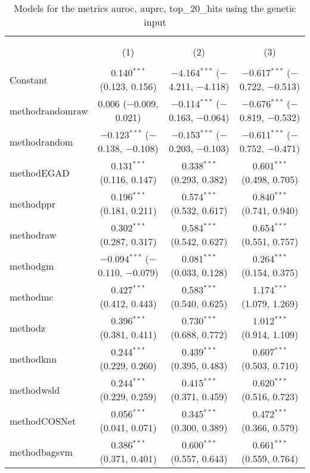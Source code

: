 
\begin{table}[!htbp] \centering 
  \caption{Models for the metrics auroc, auprc, top_20_hits using the genetic input} 
  \label{} 
\begin{tabular}{@{\extracolsep{5pt}}lccc} 
\\[-1.8ex]\hline 
\hline \\[-1.8ex] 
\\[-1.8ex] & (1) & (2) & (3)\\ 
\hline \\[-1.8ex] 
 Constant & 0.140$^{***}$ (0.123, 0.156) & $-$4.164$^{***}$ ($-$4.211, $-$4.118) & $-$0.617$^{***}$ ($-$0.722, $-$0.513) \\ 
  methodrandomraw & 0.006 ($-$0.009, 0.021) & $-$0.114$^{***}$ ($-$0.163, $-$0.064) & $-$0.676$^{***}$ ($-$0.819, $-$0.532) \\ 
  methodrandom & $-$0.123$^{***}$ ($-$0.138, $-$0.108) & $-$0.153$^{***}$ ($-$0.203, $-$0.103) & $-$0.611$^{***}$ ($-$0.752, $-$0.471) \\ 
  methodEGAD & 0.131$^{***}$ (0.116, 0.147) & 0.338$^{***}$ (0.293, 0.382) & 0.601$^{***}$ (0.498, 0.705) \\ 
  methodppr & 0.196$^{***}$ (0.181, 0.211) & 0.574$^{***}$ (0.532, 0.617) & 0.840$^{***}$ (0.741, 0.940) \\ 
  methodraw & 0.302$^{***}$ (0.287, 0.317) & 0.584$^{***}$ (0.542, 0.627) & 0.654$^{***}$ (0.551, 0.757) \\ 
  methodgm & $-$0.094$^{***}$ ($-$0.110, $-$0.079) & 0.081$^{***}$ (0.033, 0.128) & 0.264$^{***}$ (0.154, 0.375) \\ 
  methodmc & 0.427$^{***}$ (0.412, 0.443) & 0.583$^{***}$ (0.540, 0.625) & 1.174$^{***}$ (1.079, 1.269) \\ 
  methodz & 0.396$^{***}$ (0.381, 0.411) & 0.730$^{***}$ (0.688, 0.772) & 1.012$^{***}$ (0.914, 1.109) \\ 
  methodknn & 0.244$^{***}$ (0.229, 0.260) & 0.439$^{***}$ (0.395, 0.483) & 0.607$^{***}$ (0.503, 0.710) \\ 
  methodwsld & 0.244$^{***}$ (0.229, 0.259) & 0.415$^{***}$ (0.371, 0.459) & 0.620$^{***}$ (0.516, 0.723) \\ 
  methodCOSNet & 0.056$^{***}$ (0.041, 0.071) & 0.345$^{***}$ (0.300, 0.389) & 0.472$^{***}$ (0.366, 0.579) \\ 
  methodbagsvm & 0.386$^{***}$ (0.371, 0.401) & 0.600$^{***}$ (0.557, 0.643) & 0.661$^{***}$ (0.559, 0.764) \\ 

\end{tabular}
\end{table}
